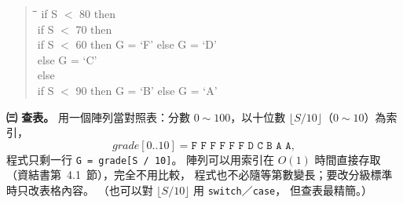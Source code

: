 \begin{pastsoln}
\begin{quote}
\small
\begin{tabbing}
\hspace*{2em}\=\hspace*{2em}\=\hspace*{2em}\=\kill
if S $<$ 80 then\\
\> if S $<$ 70 then\\
\>\> if S $<$ 60 then G = `F' else G = `D'\\
\> else G = `C'\\
else\\
\> if S $<$ 90 then G = `B' else G = `A'
\end{tabbing}
\end{quote}

\textbf{㈢ 查表。} 用一個陣列當對照表：分數 $0 \sim 100$，以十位數 $\lfloor S / 10 \rfloor$（$0 \sim 10$）為索引，
\[
\mathit{grade}[0..10] = \texttt{F F F F F F D C B A A},
\]
程式只剩一行 \texttt{G = grade[S / 10]}。 陣列可以用索引在 $O(1)$ 時間直接存取（資結書第~4.1~節），完全不用比較，
程式也不必隨等第數變長；要改分級標準時只改表格內容。 （也可以對 $\lfloor S/10 \rfloor$ 用 \texttt{switch}／\texttt{case}，
但查表最精簡。）
\end{pastsoln}
